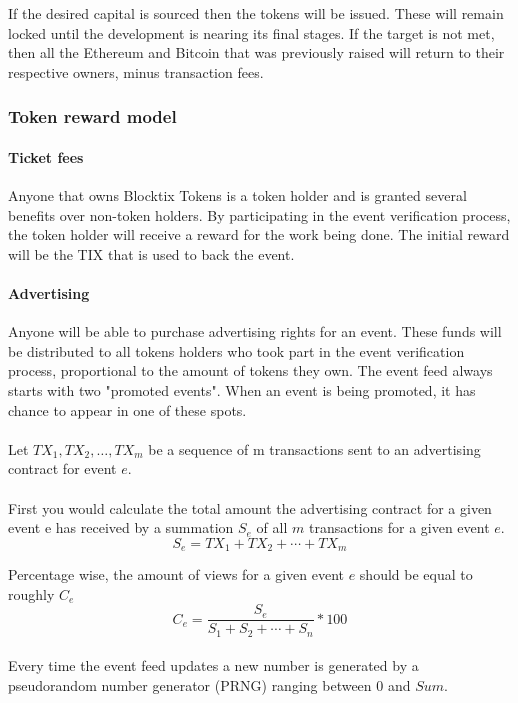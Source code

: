 \documentclass[a4paper]{article}
\begin{document}
If the desired capital is sourced then the tokens will be issued. These will remain locked until the development is nearing its final stages. If the target is not met, then all the Ethereum and Bitcoin that was previously raised will return to their respective owners, minus transaction fees.

\subsubsection{Token reward model}
\paragraph{Ticket fees}
Anyone that owns Blocktix Tokens is a token holder and is granted several benefits over non-token holders.
By participating in the event verification process, the token holder will receive a reward for the work being done. The initial reward will be the TIX that is used to back the event.

\paragraph{Advertising}
Anyone will be able to purchase advertising rights for an event. These funds will be distributed to all tokens holders who took part in the event verification process, proportional to the amount of tokens they own. The event feed always starts with two "promoted events". When an event is being promoted, it has chance to appear in one of these spots.

\paragraph{} Let $TX_1, TX_2, \ldots, TX_m$ be a sequence of m transactions sent to an advertising contract for event $e$.

\paragraph{}First you would calculate the total amount the advertising contract for a given event e has received by a summation $S_e$ of all $m$ transactions for a given event $e$.
\[S_e = TX_1 + TX_2 + \cdots + TX_m\]

Percentage wise, the amount of views for a given event $e$ should be equal to roughly $C_e$
\[C_e = \frac{S_e}{S_1 + S_2 + \cdots + S_n}*100\]

\paragraph{}
Every time the event feed updates a new number is generated by a pseudorandom number generator (PRNG) ranging between 0 and $Sum$. 
\end{document}
